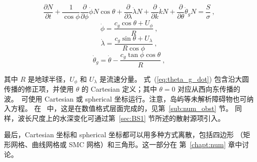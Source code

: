 \begin{equation}
\frac{\partial N}{\partial t} +
\frac{1}{\cos \phi} \frac{\partial}{\partial \phi} \dot{\phi}
    N \cos \theta +
\frac{\partial}{\partial \lambda} \dot{\lambda}N +
\frac{\partial}{\partial k} \dot{k} N +
\frac{\partial}{\partial \theta} \dot{\theta}_g N
= \frac{S}{\sigma} \: ,\label{eq:bal_sphere}
\end{equation}
\begin{equation}
\dot{\phi} = \frac{c_g \cos \theta + U_\phi}{R}
\: , \label{eq:phi_dot}
\end{equation}
\begin{equation}
\dot{\lambda} =  \frac{c_g \sin \theta + U_\lambda}{R \cos \phi}
\: , \label{eq:lambda_dot}
\end{equation}
\begin{equation}
\dot{\theta}_g = \dot{\theta} -
\frac{c_g \tan \phi \cos \theta}{R}
\: , \label{eq:theta_g_dot}
\end{equation}

\noindent
其中 $R$ 是地球半径，$U_\phi$ 和 $U_\lambda$ 是流速分量。
式~(\ref{eq:theta_g_dot}) 包含沿大圆传播的修正项，并使用 $\theta$ 的
Cartesian 定义；其中 $\theta = 0$ 对应从西向东传播的波。\ws\ 可使用
Cartesian 或 spherical 坐标运行。注意，岛屿等未解析障碍物也可纳入方程。
在 \ws\ 中，这是在数值格式层面完成的，见第~\ref{sub:num_obst} 节。
同样，波长尺度上的水深变化可通过第~\ref{sec:BS1} 节所述的散射源项引入。

最后，Cartesian 坐标和 spherical 坐标都可以用多种方式离散，包括四边形
（矩形网格、曲线网格或 SMC 网格）和三角形。这一部分在
第~\ref{chapt:num} 章中讨论。
